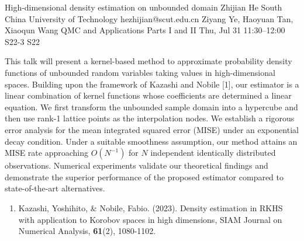 \begin{talk}
  {High-dimensional density estimation on  unbounded domain}%
  {Zhijian He}%
  {South China University of Technology}%
  {hezhijian@scut.edu.cn}%
  {Ziyang Ye, Haoyuan Tan, Xiaoqun Wang}%
  {QMC and Applications Parts I and II}%
  {Thu, Jul 31 11:30--12:00}%
  {S22-3}%
  {S22}%
    
   
This talk will present a kernel-based method to approximate probability density functions of unbounded random variables taking values in high-dimensional spaces. Building upon the framework of Kazashi and Nobile [1], our estimator is a linear combination of kernel functions whose coefficients are determined a linear equation. We first transform the unbounded sample domain into a hypercube and then use rank-1 lattice points as the interpolation nodes.
We establish a rigorous error analysis for the mean integrated squared error (MISE) under an exponential decay condition.  Under a suitable smoothness assumption, our method attains an MISE rate  approaching $O(N^{-1})$ for $N$ independent identically distributed observations. Numerical experiments validate our theoretical findings and demonstrate the superior performance of the proposed estimator compared to state-of-the-art alternatives.
\medskip


\begin{enumerate}
 \item[{[1]}] Kazashi, Yoshihito, \& Nobile, Fabio. (2023). Density estimation in {RKHS} with application to Korobov spaces in high dimensions, SIAM Journal on Numerical Analysis, \textbf{61}(2), 1080-1102.
\end{enumerate}

\end{talk}

